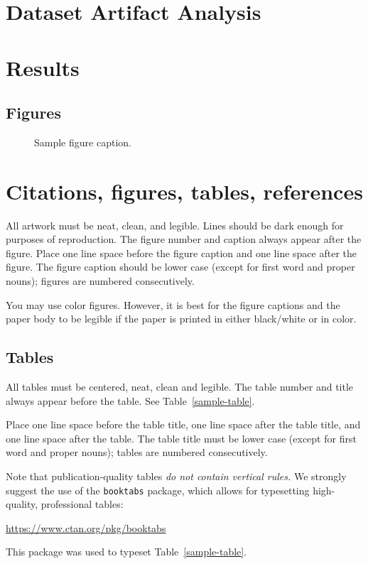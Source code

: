 \documentclass{article}
\begin{document}
\section{Dataset Artifact Analysis}

\section{Results}

\subsection{Figures}

\begin{figure}
  \centering
  \fbox{\rule[-.5cm]{0cm}{4cm} \rule[-.5cm]{4cm}{0cm}}
  \caption{Sample figure caption.}
\end{figure}



\section{Citations, figures, tables, references}
\label{others}


All artwork must be neat, clean, and legible. Lines should be dark
enough for purposes of reproduction. The figure number and caption
always appear after the figure. Place one line space before the figure
caption and one line space after the figure. The figure caption should
be lower case (except for first word and proper nouns); figures are
numbered consecutively.

You may use color figures.  However, it is best for the figure
captions and the paper body to be legible if the paper is printed in
either black/white or in color.

\subsection{Tables}

All tables must be centered, neat, clean and legible.  The table
number and title always appear before the table.  See
Table~\ref{sample-table}.

Place one line space before the table title, one line space after the
table title, and one line space after the table. The table title must
be lower case (except for first word and proper nouns); tables are
numbered consecutively.

Note that publication-quality tables \emph{do not contain vertical
  rules.} We strongly suggest the use of the \verb+booktabs+ package,
which allows for typesetting high-quality, professional tables:
\begin{center}
  \url{https://www.ctan.org/pkg/booktabs}
\end{center}
This package was used to typeset Table~\ref{sample-table}.
\end{document}
